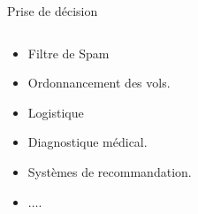 \documentclass{beamer}
\begin{document}
\begin{frame}[t]{Prise de décision}
\begin{columns}
  \begin{column}{0.5\textwidth}
    \begin{itemize}
      \item Filtre de Spam 
      \item Ordonnancement des vols.
      \item Logistique
      \item Diagnostique médical.
      \item Systèmes de recommandation.
      \item $\ldots.$
    \end{itemize} 
  \end{column}
  \begin{column}{0.5\textwidth}
  \end{column}
\end{columns}  
\end{frame}
\end{document}
